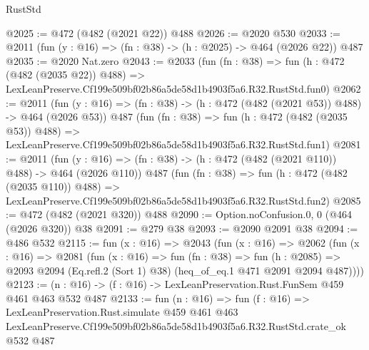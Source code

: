 \begin{lexlean}{RustStd}
\begin{coremodule}
@2025 := @472 (@482 (@2021 @22)) @488
@2026 := @2020 @530
@2033 := @2011 (fun (y : @16) => (fn : @38) -> (h : @2025) -> @464 (@2026 @22)) @487
@2035 := @2020 Nat.zero
@2043 := @2033
    (fun (fn : @38) =>
    fun (h : @472 (@482 (@2035 @22)) @488) =>
    LexLeanPreserve.Cf199e509bf02b86a5de58d1b4903f5a6.R32.RustStd.fun0)
@2062 := @2011
    (fun (y : @16) => (fn : @38) -> (h : @472 (@482 (@2021 @53)) @488) -> @464 (@2026 @53))
    @487
    (fun (fn : @38) =>
    fun (h : @472 (@482 (@2035 @53)) @488) =>
    LexLeanPreserve.Cf199e509bf02b86a5de58d1b4903f5a6.R32.RustStd.fun1)
@2081 := @2011
    (fun (y : @16) => (fn : @38) -> (h : @472 (@482 (@2021 @110)) @488) -> @464 (@2026 @110))
    @487
    (fun (fn : @38) =>
    fun (h : @472 (@482 (@2035 @110)) @488) =>
    LexLeanPreserve.Cf199e509bf02b86a5de58d1b4903f5a6.R32.RustStd.fun2)
@2085 := @472 (@482 (@2021 @320)) @488
@2090 := Option.noConfusion.{0, 0} (@464 (@2026 @320)) @38
@2091 := @279 @38
@2093 := @2090 @2091 @38
@2094 := @486 @532
@2115 := fun (x : @16) =>
  @2043
    (fun (x : @16) =>
    @2062
      (fun (x : @16) =>
      @2081
        (fun (x : @16) =>
        fun (fn : @38) =>
        fun (h : @2085) =>
        @2093 @2094 (Eq.refl.{2} (Sort 1) @38) (heq_of_eq.{1} @471 @2091 @2094 @487))))
@2123 := (n : @16) -> (f : @16) -> LexLeanPreservation.Rust.FunSem @459 @461 @463 @532 @487
@2133 := fun (n : @16) =>
  fun (f : @16) =>
  LexLeanPreservation.Rust.simulate
    @459
    @461
    @463
    LexLeanPreserve.Cf199e509bf02b86a5de58d1b4903f5a6.R32.RustStd.crate_ok
    @532
    @487
\end{coremodule}
\end{lexlean}
